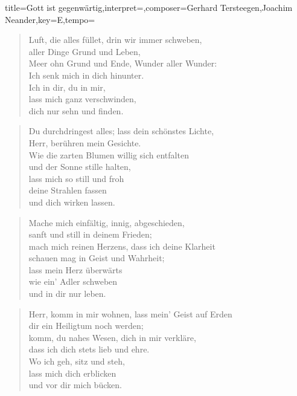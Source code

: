 \documentclass[]{leadsheet}
\begin{document}
\begin{song}[remember-chords,transpose={0}]{title={Gott ist gegenwärtig},interpret={},composer={{Gerhard Tersteegen},{Joachim Neander}},key={E},tempo={}}
\begin{verse}
Luft, die alles füllet, drin wir immer schweben, \\
aller Dinge Grund und Leben, \\
Meer ohn Grund und Ende, Wunder aller Wunder: \\
Ich senk mich in dich hinunter. \\
Ich in dir,
du in mir, \\
lass mich ganz verschwinden, \\
dich nur sehn und finden.
\end{verse}

\begin{verse}
Du durchdringest alles; lass dein schönstes Lichte, \\
Herr, berühren mein Gesichte. \\
Wie die zarten Blumen willig sich entfalten \\
und der Sonne stille halten, \\
lass mich so
still und froh \\
deine Strahlen fassen \\
und dich wirken lassen.
\end{verse}

\begin{verse}
Mache mich einfältig, innig, abgeschieden, \\
sanft und still in deinem Frieden; \\
mach mich reinen Herzens, dass ich deine Klarheit \\
schauen mag in Geist und Wahrheit; \\
lass mein Herz
überwärts \\
wie ein’ Adler schweben \\
und in dir nur leben.
\end{verse}

\begin{verse}
Herr, komm in mir wohnen, lass mein’ Geist auf Erden \\
dir ein Heiligtum noch werden; \\
komm, du nahes Wesen, dich in mir verkläre, \\
dass ich dich stets lieb und ehre. \\
Wo ich geh,
sitz und steh, \\
lass mich dich erblicken \\
und vor dir mich bücken.
\end{verse}


\end{song}
\end{document}
